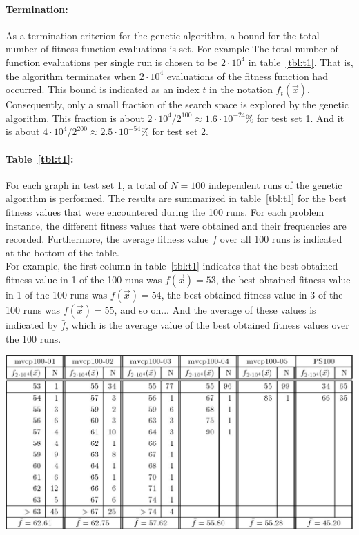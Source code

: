 \documentclass[12pt]{article}
\begin{document}
\paragraph{Termination:}
As a termination criterion for the genetic algorithm,
a bound for the total number of fitness function evaluations is set.
For example The total number of function evaluations per single run
is chosen to be $2 \cdot 10^4$ in table~\ref{tbl:t1}.
That is, the algorithm terminates when $2 \cdot 10^4$ evaluations of the fitness function
had occurred.
This bound is indicated as an index $t$ in the notation $f_t(\vec{x})$.
Consequently, only a small fraction of the search space is explored by the genetic algorithm.
This fraction is about
$ 2 \cdot 10^4 / 2^{100} \approx 1.6 \cdot 10^{-24} \% $
for test set 1.
And it is about $ 4 \cdot 10^4 / 2^{200} \approx 2.5 \cdot 10^{-54} \% $ for test set 2.

\paragraph{Table~\ref{tbl:t1}:}
For each graph in test set 1, a total of
$N = 100$ independent runs of the genetic algorithm is performed.
The results are summarized in table~\ref{tbl:t1} for the best
fitness values that were encountered during the 100 runs.
For each problem instance, the different fitness values that were
obtained and their frequencies are recorded.
Furthermore, the average fitness value $\bar{f}$ over
all 100 runs is indicated at the bottom of the table.\\
For example, the first column in table~\ref{tbl:t1} indicates
that the best obtained fitness value in 1 of the 100 runs was $f(\vec{x}) = 53$,
the best obtained fitness value in 1 of the 100 runs was $f(\vec{x}) = 54$,
the best obtained fitness value in 3 of the 100 runs was $f(\vec{x}) = 55$, and so on...
And the average of these values is indicated by $\bar{f}$, which is the average value of
the best obtained fitness values over the 100 runs.


\begin{table}[!htbp]
\centering
\includegraphics[width=1\textwidth]{t1}
\caption{%
Experimental results obtained by the genetic algorithm for five random graphs of size $n = 100$ with edge density: $d = 0.1$ (``mvcp100-01''), $d = 0.2$ (``mvcp100-02''), $d = 0.3$ (``mvcp100-03''), $d = 0.5$ (``mvcp100-04''), $d = 0.5$ (``mvcp100-05'') and the regular graph of size $n = 100 \ (k=32)$ from Papadimitriou and Steiglitz (``PS100'').%
}
\label{tbl:t1}
\end{table}
\end{document}
